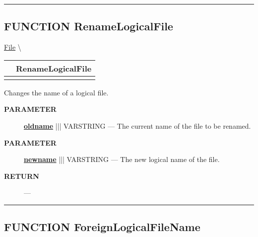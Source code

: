 \rule{\linewidth}{0.5pt}
\subsection*{\textsf{\colorbox{headtoc}{\color{white} FUNCTION}
RenameLogicalFile}}

\hypertarget{ecldoc:file.renamelogicalfile}{}
\hspace{0pt} \hyperlink{ecldoc:File}{File} \textbackslash 

{\renewcommand{\arraystretch}{1.5}
\begin{tabularx}{\textwidth}{|>{\raggedright\arraybackslash}l|X|}
\hline
\hspace{0pt}\mytexttt{\color{red} } & \textbf{RenameLogicalFile} \\
\hline
\multicolumn{2}{|>{\raggedright\arraybackslash}X|}{\hspace{0pt}\mytexttt{\color{param} (varstring oldname, varstring newname)}} \\
\hline
\end{tabularx}
}

\par





Changes the name of a logical file.






\par
\begin{description}
\item [\colorbox{tagtype}{\color{white} \textbf{\textsf{PARAMETER}}}] \textbf{\underline{oldname}} ||| VARSTRING --- The current name of the file to be renamed.
\item [\colorbox{tagtype}{\color{white} \textbf{\textsf{PARAMETER}}}] \textbf{\underline{newname}} ||| VARSTRING --- The new logical name of the file.
\end{description}







\par
\begin{description}
\item [\colorbox{tagtype}{\color{white} \textbf{\textsf{RETURN}}}] \textbf{} --- 
\end{description}




\rule{\linewidth}{0.5pt}
\subsection*{\textsf{\colorbox{headtoc}{\color{white} FUNCTION}
ForeignLogicalFileName}}

